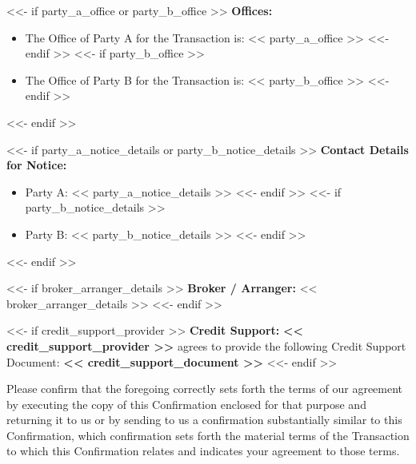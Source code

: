 \documentclass[11pt, a4paper]{article}
\begin{document}
<<- if party_a_office or party_b_office >>
\noindent \textbf{Offices:}
\begin{itemize}[leftmargin=2cm, label={}, itemsep=3pt]
<<- if party_a_office >>
    \item The Office of Party A for the Transaction is: << party_a_office >>
<<- endif >>
<<- if party_b_office >>
    \item The Office of Party B for the Transaction is: << party_b_office >>
<<- endif >>
\end{itemize}
\vspace{0.3cm}
<<- endif >>

<<- if party_a_notice_details or party_b_notice_details >>
\noindent \textbf{Contact Details for Notice:}
\begin{itemize}[leftmargin=2cm, label={}, itemsep=3pt]
<<- if party_a_notice_details >>
    \item Party A: << party_a_notice_details >>
<<- endif >>
<<- if party_b_notice_details >>
    \item Party B: << party_b_notice_details >>
<<- endif >>
\end{itemize}
\vspace{0.3cm}
<<- endif >>

<<- if broker_arranger_details >>
\noindent \textbf{Broker / Arranger:} << broker_arranger_details >>
\vspace{0.3cm}
<<- endif >>

<<- if credit_support_provider >>
\noindent \textbf{Credit Support:} \textbf{<< credit_support_provider >>} agrees to provide the following Credit Support Document: \textbf{<< credit_support_document >>}
\vspace{0.3cm}
<<- endif >>

\vspace{1cm}


\noindent Please confirm that the foregoing correctly sets forth the terms of our agreement by executing the copy of this Confirmation enclosed for that purpose and returning it to us or by sending to us a confirmation substantially similar to this Confirmation, which confirmation sets forth the material terms of the Transaction to which this Confirmation relates and indicates your agreement to those terms.

\vspace{2cm}
\end{document}
